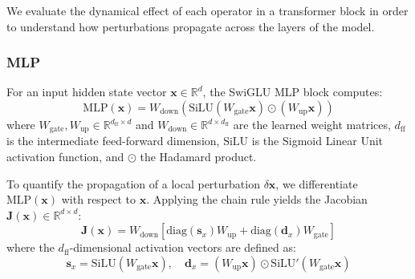 \documentclass[a4paper,12pt]{article}
\begin{document}
    We evaluate the dynamical effect of each operator in a transformer block in order to understand how perturbations propagate across the layers of the model. 

    \subsubsection{MLP}

    For an input hidden state vector $\mathbf{x} \in \mathbb{R}^d$, the SwiGLU MLP block computes:
    \begin{equation}
        \text{MLP}(\mathbf{x}) = W_{\text{down}} \left( \text{SiLU}(W_{\text{gate}} \mathbf{x}) \odot (W_{\text{up}} \mathbf{x}) \right)
    \end{equation}
    where $W_{\text{gate}}, W_{\text{up}} \in \mathbb{R}^{d_{\text{ff}} \times d}$ and $W_{\text{down}} \in \mathbb{R}^{d \times d_{\text{ff}}}$ are the learned weight matrices, $d_{\text{ff}}$ is the intermediate feed-forward dimension, $\text{SiLU}$ is the Sigmoid Linear Unit activation function, and $\odot$ the Hadamard product. 

    To quantify the propagation of a local perturbation $\delta \mathbf{x}$, we differentiate $\text{MLP}(\mathbf{x})$ with respect to $\mathbf{x}$. Applying the chain rule yields the Jacobian $\mathbf{J}(\mathbf{x}) \in \mathbb{R}^{d \times d}$:
    \begin{equation}
        \mathbf{J}(\mathbf{x}) = W_{\text{down}} \left[ \text{diag}(\mathbf{s}_x) W_{\text{up}} + \text{diag}(\mathbf{d}_x) W_{\text{gate}} \right]
    \end{equation}
    where the $d_{\text{ff}}$-dimensional activation vectors are defined as:
    \begin{equation}
        \mathbf{s}_x = \text{SiLU}(W_{\text{gate}} \mathbf{x}), \quad \mathbf{d}_x = (W_{\text{up}} \mathbf{x}) \odot \text{SiLU}'(W_{\text{gate}} \mathbf{x})
    \end{equation}
\end{document}
